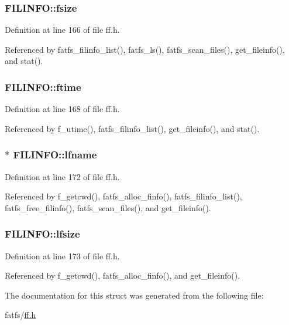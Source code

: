 \hypertarget{structFILINFO_aee7441af7dc0c443d1e1e6011cc7dcac}{
\subsubsection[{fsize}]{ F\-I\-L\-I\-N\-F\-O\-::fsize}}\label{structFILINFO_aee7441af7dc0c443d1e1e6011cc7dcac}


Definition at line 166 of file ff.\-h.



Referenced by fatfs\-\_\-filinfo\-\_\-list(), fatfs\-\_\-ls(), fatfs\-\_\-scan\-\_\-files(), get\-\_\-fileinfo(), and stat().

\hypertarget{structFILINFO_ae0f751b79621bf7b29669f177bbe6b9a}{
\subsubsection[{ftime}]{ F\-I\-L\-I\-N\-F\-O\-::ftime}}\label{structFILINFO_ae0f751b79621bf7b29669f177bbe6b9a}


Definition at line 168 of file ff.\-h.



Referenced by f\-\_\-utime(), fatfs\-\_\-filinfo\-\_\-list(), get\-\_\-fileinfo(), and stat().

\hypertarget{structFILINFO_ac4506c29e0219130dff46b01a1b5c023}{
\subsubsection[{lfname}]{$\ast$ F\-I\-L\-I\-N\-F\-O\-::lfname}}\label{structFILINFO_ac4506c29e0219130dff46b01a1b5c023}


Definition at line 172 of file ff.\-h.



Referenced by f\-\_\-getcwd(), fatfs\-\_\-alloc\-\_\-finfo(), fatfs\-\_\-filinfo\-\_\-list(), fatfs\-\_\-free\-\_\-filinfo(), fatfs\-\_\-scan\-\_\-files(), and get\-\_\-fileinfo().

\hypertarget{structFILINFO_a2527c511ff4d12d285dbf3c4b3c9fb7b}{
\subsubsection[{lfsize}]{ F\-I\-L\-I\-N\-F\-O\-::lfsize}}\label{structFILINFO_a2527c511ff4d12d285dbf3c4b3c9fb7b}


Definition at line 173 of file ff.\-h.



Referenced by f\-\_\-getcwd(), fatfs\-\_\-alloc\-\_\-finfo(), and get\-\_\-fileinfo().



The documentation for this struct was generated from the following file\-:\begin{DoxyCompactItemize}
\item 
fatfs/\hyperlink{ff_8h}{ff.\-h}\end{DoxyCompactItemize}
